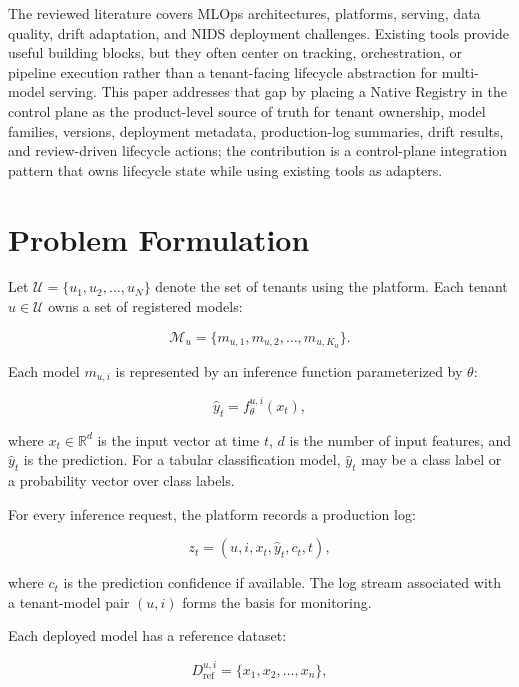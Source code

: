 \documentclass[runningheads]{llncs}
\begin{document}
The reviewed literature covers MLOps architectures, platforms, serving, data quality, drift adaptation, and NIDS deployment challenges. Existing tools provide useful building blocks, but they often center on tracking, orchestration, or pipeline execution rather than a tenant-facing lifecycle abstraction for multi-model serving. This paper addresses that gap by placing a Native Registry in the control plane as the product-level source of truth for tenant ownership, model families, versions, deployment metadata, production-log summaries, drift results, and review-driven lifecycle actions; the contribution is a control-plane integration pattern that owns lifecycle state while using existing tools as adapters.

\section{Problem Formulation}

Let $\mathcal{U}=\{u_1,u_2,\ldots,u_N\}$ denote the set of tenants using the platform. Each tenant $u \in \mathcal{U}$ owns a set of registered models:

\begin{equation}
\mathcal{M}_u=\{m_{u,1},m_{u,2},\ldots,m_{u,K_u}\}.
\end{equation}

Each model $m_{u,i}$ is represented by an inference function parameterized by $\theta$:

\begin{equation}
\hat{y}_t=f_{\theta}^{u,i}(x_t),
\end{equation}

where $x_t \in \mathbb{R}^{d}$ is the input vector at time $t$, $d$ is the number of input features, and $\hat{y}_t$ is the prediction. For a tabular classification model, $\hat{y}_t$ may be a class label or a probability vector over class labels.

For every inference request, the platform records a production log:

\begin{equation}
z_t=(u,i,x_t,\hat{y}_t,c_t,t),
\end{equation}

where $c_t$ is the prediction confidence if available. The log stream associated with a tenant-model pair $(u,i)$ forms the basis for monitoring.

Each deployed model has a reference dataset:

\begin{equation}
D_{\mathrm{ref}}^{u,i}=\{x_1,x_2,\ldots,x_n\},
\end{equation}
\end{document}
